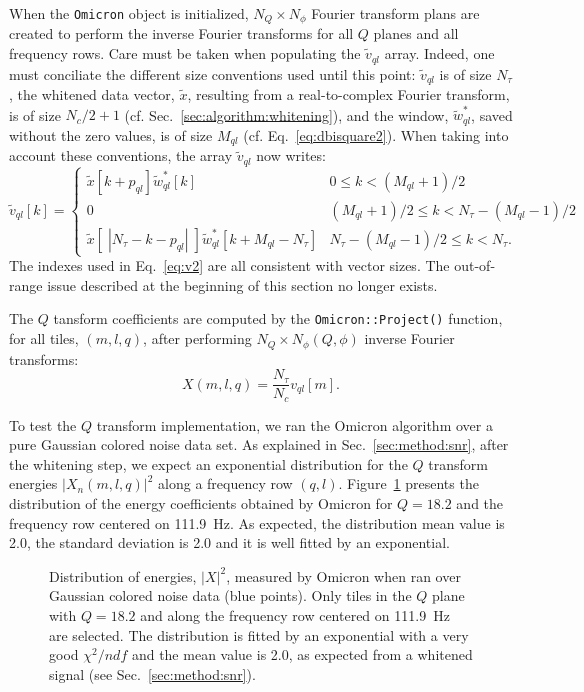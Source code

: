 When the \texttt{Omicron} object is initialized, $N_Q\times N_{\phi}$ Fourier transform plans are created to perform the inverse Fourier transforms for all $Q$ planes and all frequency rows. Care must be taken when populating the $\tilde{v}_{ql}$ array. Indeed, one must conciliate the different size conventions used until this point: $\tilde{v}_{ql}$ is of size $N_\tau $, the whitened data vector, $\tilde{x}$, resulting from a real-to-complex Fourier transform, is of size $N_c/2+1$ (cf. Sec.~\ref{sec:algorithm:whitening}), and the window, $\tilde{w}^*_{ql}$, saved without the zero values, is of size $M_{ql}$ (cf. Eq.~\ref{eq:dbisquare2}). When taking into account these conventions, the array $\tilde{v}_{ql}$ now writes:
\begin{equation}
  \tilde{v}_{ql}[k] =
  \begin{cases}
    \tilde{x}[k+p_{ql}]\tilde{w}_{ql}^*[k]                     & 0 \le k < (M_{ql}+1)/2 \\
    0                                                        & (M_{ql}+1)/2 \le k < N_\tau-(M_{ql}-1)/2 \\
    \tilde{x}[\;|N_\tau-k-p_{ql}|\;]\tilde{w}_{ql}^*[k+M_{ql}-N_\tau] & N_\tau-(M_{ql}-1)/2 \le k < N_\tau.
  \end{cases}
  \label{eq:v2}
\end{equation}
The indexes used in Eq.~\ref{eq:v2} are all consistent with vector sizes. The out-of-range issue described at the beginning of this section no longer exists.

The $Q$ tansform coefficients are computed by the \texttt{Omicron::Project()} function, for all tiles, $(m,l,q)$, after performing $N_Q\times N_{\phi}(Q,\phi)$ inverse Fourier transforms:
\begin{equation}
  X(m, l, q) = \frac{N_\tau}{N_c} v_{ql}[m].
  \label{eq:qcoeff}
\end{equation}

To test the $Q$ transform implementation, we ran the Omicron algorithm over a pure Gaussian colored noise data set. As explained in Sec.~\ref{sec:method:snr}, after the whitening step, we expect an exponential distribution for the $Q$ transform energies $|X_n(m, l, q)|^2$ along a frequency row $(q,l)$. Figure~\ref{fig:noise_energy_gaus} presents the distribution of the energy coefficients obtained by Omicron for $Q=18.2$ and the frequency row centered on 111.9~Hz. As expected, the distribution mean value is 2.0, the standard deviation is 2.0 and it is well fitted by an exponential.
\begin{figure}
  \center
  \caption{Distribution of energies, $|X|^2$, measured by Omicron when ran over Gaussian colored noise data (blue points).  Only tiles in the $Q$ plane with $Q=18.2$ and along the frequency row centered on 111.9~Hz are selected. The distribution is fitted by an exponential with a very good $\chi^2/ndf$ and the mean value is 2.0, as expected from a whitened signal (see Sec.~\ref{sec:method:snr}).}
  \label{fig:noise_energy_gaus}
\end{figure}

